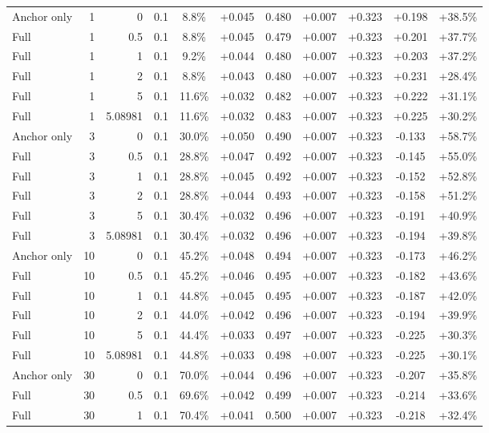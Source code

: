 \begin{table}[htbp]
\begin{tabular}{lrrrccccccc}
Anchor only & 1 & 0 & 0.1 & 8.8\% & +0.045 & 0.480 & +0.007 & +0.323 & +0.198 & +38.5\% \\
Full & 1 & 0.5 & 0.1 & 8.8\% & +0.045 & 0.479 & +0.007 & +0.323 & +0.201 & +37.7\% \\
Full & 1 & 1 & 0.1 & 9.2\% & +0.044 & 0.480 & +0.007 & +0.323 & +0.203 & +37.2\% \\
Full & 1 & 2 & 0.1 & 8.8\% & +0.043 & 0.480 & +0.007 & +0.323 & +0.231 & +28.4\% \\
Full & 1 & 5 & 0.1 & 11.6\% & +0.032 & 0.482 & +0.007 & +0.323 & +0.222 & +31.1\% \\
Full & 1 & 5.08981 & 0.1 & 11.6\% & +0.032 & 0.483 & +0.007 & +0.323 & +0.225 & +30.2\% \\
Anchor only & 3 & 0 & 0.1 & 30.0\% & +0.050 & 0.490 & +0.007 & +0.323 & -0.133 & +58.7\% \\
Full & 3 & 0.5 & 0.1 & 28.8\% & +0.047 & 0.492 & +0.007 & +0.323 & -0.145 & +55.0\% \\
Full & 3 & 1 & 0.1 & 28.8\% & +0.045 & 0.492 & +0.007 & +0.323 & -0.152 & +52.8\% \\
Full & 3 & 2 & 0.1 & 28.8\% & +0.044 & 0.493 & +0.007 & +0.323 & -0.158 & +51.2\% \\
Full & 3 & 5 & 0.1 & 30.4\% & +0.032 & 0.496 & +0.007 & +0.323 & -0.191 & +40.9\% \\
Full & 3 & 5.08981 & 0.1 & 30.4\% & +0.032 & 0.496 & +0.007 & +0.323 & -0.194 & +39.8\% \\
Anchor only & 10 & 0 & 0.1 & 45.2\% & +0.048 & 0.494 & +0.007 & +0.323 & -0.173 & +46.2\% \\
Full & 10 & 0.5 & 0.1 & 45.2\% & +0.046 & 0.495 & +0.007 & +0.323 & -0.182 & +43.6\% \\
Full & 10 & 1 & 0.1 & 44.8\% & +0.045 & 0.495 & +0.007 & +0.323 & -0.187 & +42.0\% \\
Full & 10 & 2 & 0.1 & 44.0\% & +0.042 & 0.496 & +0.007 & +0.323 & -0.194 & +39.9\% \\
Full & 10 & 5 & 0.1 & 44.4\% & +0.033 & 0.497 & +0.007 & +0.323 & -0.225 & +30.3\% \\
Full & 10 & 5.08981 & 0.1 & 44.8\% & +0.033 & 0.498 & +0.007 & +0.323 & -0.225 & +30.1\% \\
Anchor only & 30 & 0 & 0.1 & 70.0\% & +0.044 & 0.496 & +0.007 & +0.323 & -0.207 & +35.8\% \\
Full & 30 & 0.5 & 0.1 & 69.6\% & +0.042 & 0.499 & +0.007 & +0.323 & -0.214 & +33.6\% \\
Full & 30 & 1 & 0.1 & 70.4\% & +0.041 & 0.500 & +0.007 & +0.323 & -0.218 & +32.4\% \\

\end{tabular}
\end{table}
